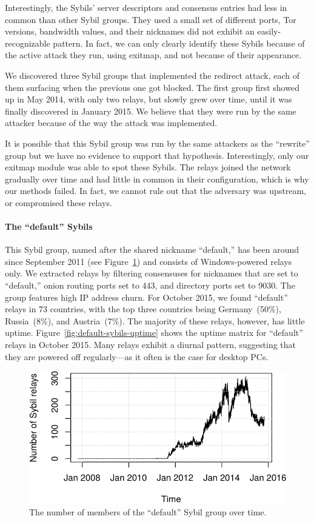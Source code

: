 Interestingly, the Sybils' server descriptors and consensus entries had less in
common than other Sybil groups.  They used a small set of different ports, Tor
versions, bandwidth values, and their nicknames did not exhibit an
easily-recognizable pattern.  In fact, we can only clearly identify these Sybils
because of the active attack they run, using exitmap, and not because of their
appearance.

We discovered three Sybil groups that implemented the redirect attack, each of
them surfacing when the previous one got blocked.  The first group first showed
up in May 2014, with only two relays, but slowly grew over time, until it was
finally discovered in January 2015.  We believe that they were run by the same
attacker because of the way the attack was implemented.

It is possible that this Sybil group was run by the same attackers as the
``rewrite'' group but we have no evidence to support that hypothesis.
Interestingly, only our exitmap module was able to spot these Sybils.  The
relays joined the network gradually over time and had little in common in their
configuration, which is why our \sys methods failed.  In fact, we cannot
rule out that the adversary was upstream, or compromised these relays.

\paragraph{The ``default'' Sybils}
This Sybil group, named after the shared nickname ``default,'' has been around
since September 2011 (see Figure~\ref{fig:default-over-time}) and consists of
Windows-powered relays only.  We extracted relays by filtering consensuses
for nicknames that are set to ``default,'' onion routing ports set to 443, and
directory ports set to 9030.  The group features high IP address churn.  For
October 2015, we found ``default'' relays in 73 countries, with the top three
countries being Germany~(50\%), Russia~(8\%), and Austria~(7\%).  The majority
of these relays, however, has little uptime.
Figure~\ref{fig:default-sybils-uptime} shows the uptime matrix for ``default''
relays in October 2015.  Many relays exhibit a diurnal pattern, suggesting
that they are powered off regularly---as it often is the case for desktop PCs.

\begin{figure}[t]
	\centering
	\includegraphics[width=\linewidth]{diagrams/default-over-time}
	\caption{The number of members of the ``default'' Sybil group over time.}
	\label{fig:default-over-time}
\end{figure}

